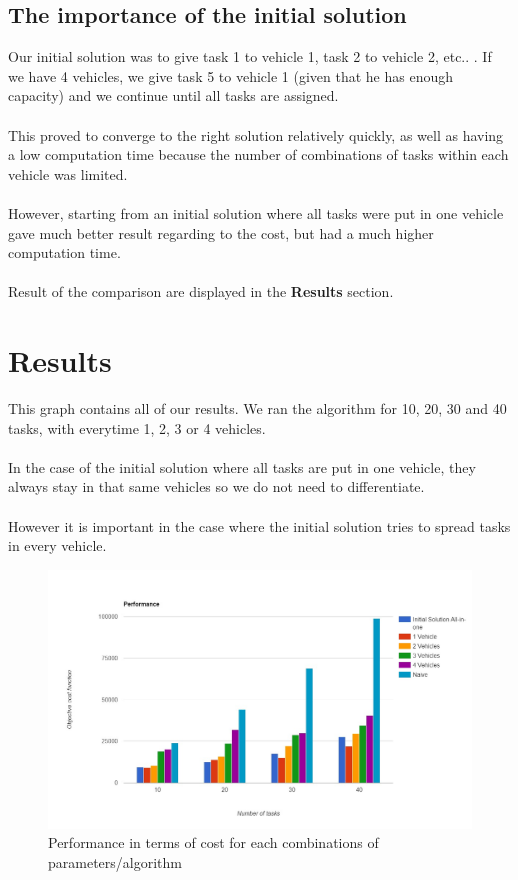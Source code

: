 \documentclass[fontsize=12pt]{scrartcl} %
\begin{document}
\subsection*{The importance of the initial solution}
Our initial solution was to give task 1 to vehicle 1, task 2 to vehicle 2, etc.. . If we have 4 vehicles, we give task 5 to vehicle 1 (given that he has enough capacity) and we continue until all tasks are assigned. \\\\
This proved to converge to the right solution relatively quickly, as well as having a low computation time because the number of combinations of tasks within each vehicle was limited. \\\\
However, starting from an initial solution where all tasks were put in one vehicle gave much better result regarding to the cost, but had a much higher computation time. \\ \\
Result of the comparison are displayed in the \textbf{Results} section.


\section*{Results}

This graph contains all of our results. We ran the algorithm for 10, 20, 30 and 40 tasks, with everytime 1, 2, 3 or 4 vehicles. \\ \\
In the case of the initial solution where all tasks are put in one vehicle, they always stay in that same vehicles so we do not need to differentiate. \\\\
However it is important in the case where the initial solution tries to spread tasks in every vehicle.

\begin{figure}[h!]

\includegraphics[width=\linewidth]{perf-graph.jpg}
\caption{Performance in terms of cost for each combinations of parameters/algorithm}

\end{figure}
\end{document}
